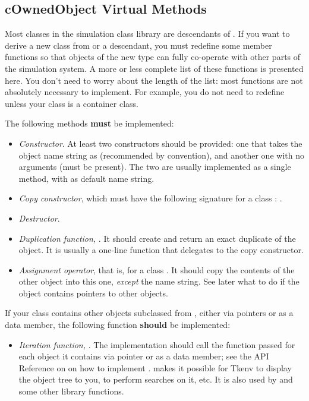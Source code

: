 \subsection{cOwnedObject Virtual Methods}

Most classes in the simulation class library are descendants of
. If you want to derive a new class from
 or a  descendant, you must redefine
some member functions so that objects of the new type can fully
co-operate with other parts of the simulation system. A more or less
complete list of these functions is presented here. You don't need to
worry about the length of the list: most functions are not
absolutely necessary to implement. For example, you do not need to
redefine  unless your class is a container class.

The following methods \textbf{must} be implemented:

\begin{itemize}
  \item{\textit{Constructor}. At least two constructors should be provided:
        one that takes the object name string as 
        (recommended by convention), and another one with no arguments
        (must be present). The two are usually implemented as a single
        method, with  as default name string.}
  \item{\textit{Copy constructor}, which must have the following signature
        for a class : .}
  \item{\textit{Destructor}.}
  \item{\textit{Duplication function,} .
        It should create and return an exact duplicate of the object.
        It is usually a one-line function that delegates to the copy constructor.}
  \item{\textit{Assignment operator}, that is, 
        for a class . It should copy the contents of the other
        object into this one, \textit{except} the name string. See later what to do
        if the object contains pointers to other objects.}
\end{itemize}

If your class contains other objects subclassed from ,
either via pointers or as a data member, the following function \textbf{should}
be implemented:

\begin{itemize}
  \item{\textit{Iteration function,} .
        The implementation should call the function passed
        for each object it contains via pointer or as a data member;
        see the API Reference on  on how to implement
        .  makes it possible
        for Tkenv to display the object tree to you, to perform searches on it, etc.
        It is also used by  and some other library functions.}
\end{itemize}

